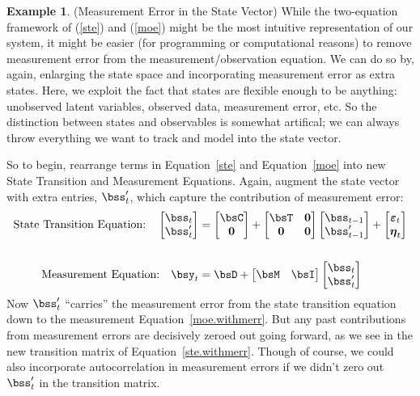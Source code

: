 \documentclass[12pt]{article}
\theoremstyle{plain}
\theoremstyle{definition}
\newtheorem{ex}[thm]{Example}
\theoremstyle{remark}
\newcommand{\bseta}{\boldsymbol{\eta}}
\newcommand{\bsvarepsilon}{\boldsymbol{\varepsilon}}
\renewcommand{\bso}{\boldsymbol{0}}
\begin{document}
\begin{ex}(Measurement Error in the State Vector)
While the two-equation framework of (\ref{ste}) and (\ref{moe}) might be
the most intuitive representation of our system, it might be easier (for
programming or computational reasons) to remove measurement error from
the measurement/observation equation. We can do so by, again, enlarging
the state space and incorporating measurement error as extra states.
Here, we exploit the fact that states are flexible enough to be
anything: unobserved latent variables, observed data, measurement error,
etc. So the distinction between states and observables is somewhat
artifical; we can always throw everything we want to track and model
into the state vector.

So to begin, rearrange terms in Equation~\ref{ste} and
Equation~\ref{moe} into new State Transition and Measurement Equations.
Again, augment the state vector with extra entries, $\bss'_t$, which
capture the contribution of measurement error:
\begin{align}
  \text{State Transition Equation:} \quad
    \begin{bmatrix} \bss_{t} \\ \bss'_t \end{bmatrix}
    &= \begin{bmatrix} \bsC \\ \bso \end{bmatrix}
    + \begin{bmatrix} \bsT & \bso \\
      \bso & \bso \end{bmatrix}
    \begin{bmatrix} \bss_{t-1} \\ \bss'_{t-1} \end{bmatrix}
    + \begin{bmatrix} \bsvarepsilon_{t} \\ \bseta_t \end{bmatrix}
    \label{ste.withmerr}
  \\ \notag \\
  \text{Measurement Equation:} \quad
    \bsy_{t} &= \bsD +
    \begin{bmatrix} \bsM & \bsI \end{bmatrix}
    \begin{bmatrix} \bss_{t} \\ \bss'_t \end{bmatrix}
    \label{moe.withmerr}
\end{align}
Now $\bss'_t$ ``carries'' the measurement error from the state
transition equation down to the measurement Equation~\ref{moe.withmerr}.
But any past contributions from measurement errors are decisively zeroed
out going forward, as we see in the new transition matrix of
Equation~\ref{ste.withmerr}. Though of course, we could also incorporate
autocorrelation in measurement errors if we didn't zero out $\bss'_t$ in
the transition matrix.
\end{ex}
\end{document}
